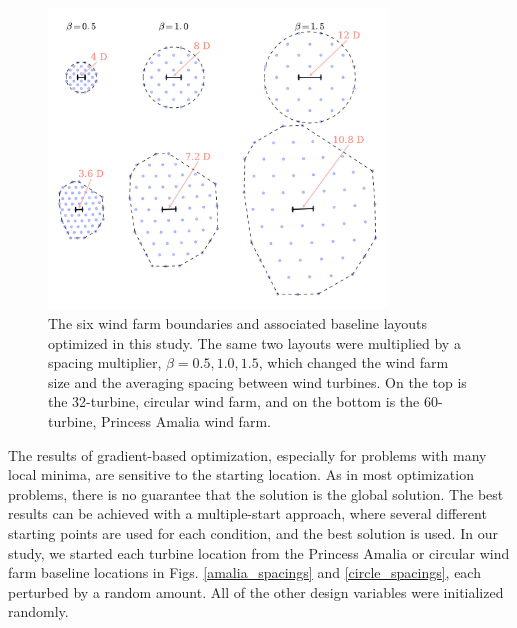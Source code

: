 \begin{figure}[htbp]
  \centering
  \includegraphics[width=0.8\textwidth]{Figures/spacing_multipliers.pdf}
  \caption{\label{farm_spacings}The six wind farm boundaries and associated baseline layouts optimized in this study. The same two layouts were multiplied by a spacing multiplier, $\beta=0.5,1.0,1.5$, which changed the wind farm size and the averaging spacing between wind turbines.  On the top is the 32-turbine, circular wind farm, and on the bottom is the 60-turbine, Princess Amalia wind farm.}
\end{figure}

The results of gradient-based optimization, especially for problems with many local minima, are sensitive to the starting location. As in most optimization problems, there is no guarantee that the solution is the global solution. The best results can be achieved with a multiple-start approach, where several different starting points are used for each condition, and the best solution is used. In our study, we started each turbine location from the Princess Amalia or circular wind farm baseline locations in Figs. \ref{amalia_spacings} and \ref{circle_spacings}, each perturbed by a random amount. All of the other design variables were initialized randomly.




